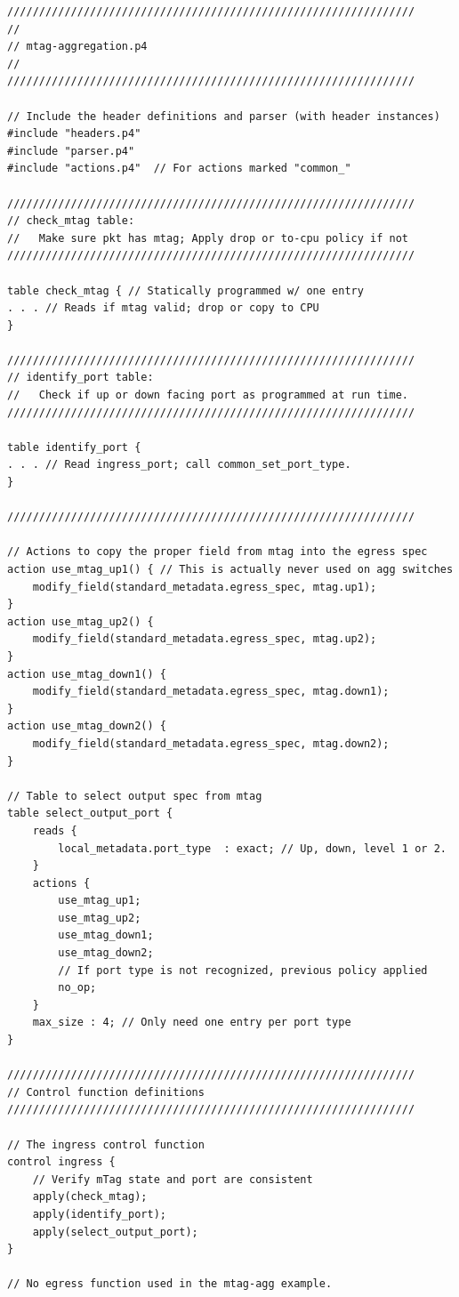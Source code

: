 \documentclass[12pt]{article}
\begin{document}
\begin{lstlisting}[style=P4style]
////////////////////////////////////////////////////////////////
//
// mtag-aggregation.p4
//
////////////////////////////////////////////////////////////////

// Include the header definitions and parser (with header instances)
#include "headers.p4"
#include "parser.p4"
#include "actions.p4"  // For actions marked "common_"

////////////////////////////////////////////////////////////////
// check_mtag table:  
//   Make sure pkt has mtag; Apply drop or to-cpu policy if not
////////////////////////////////////////////////////////////////

table check_mtag { // Statically programmed w/ one entry
. . . // Reads if mtag valid; drop or copy to CPU
}

////////////////////////////////////////////////////////////////
// identify_port table:  
//   Check if up or down facing port as programmed at run time.
////////////////////////////////////////////////////////////////

table identify_port {
. . . // Read ingress_port; call common_set_port_type.
}

////////////////////////////////////////////////////////////////

// Actions to copy the proper field from mtag into the egress spec
action use_mtag_up1() { // This is actually never used on agg switches
    modify_field(standard_metadata.egress_spec, mtag.up1);
}
action use_mtag_up2() {
    modify_field(standard_metadata.egress_spec, mtag.up2);
}
action use_mtag_down1() {
    modify_field(standard_metadata.egress_spec, mtag.down1);
}
action use_mtag_down2() {
    modify_field(standard_metadata.egress_spec, mtag.down2);
}

// Table to select output spec from mtag
table select_output_port {
    reads {
        local_metadata.port_type  : exact; // Up, down, level 1 or 2.
    }
    actions {
        use_mtag_up1;
        use_mtag_up2;
        use_mtag_down1;
        use_mtag_down2;
        // If port type is not recognized, previous policy applied
        no_op; 
    }
    max_size : 4; // Only need one entry per port type
}

////////////////////////////////////////////////////////////////
// Control function definitions
////////////////////////////////////////////////////////////////

// The ingress control function
control ingress {
    // Verify mTag state and port are consistent
    apply(check_mtag);
    apply(identify_port);
    apply(select_output_port);
}

// No egress function used in the mtag-agg example.
\end{lstlisting}
\end{document}

